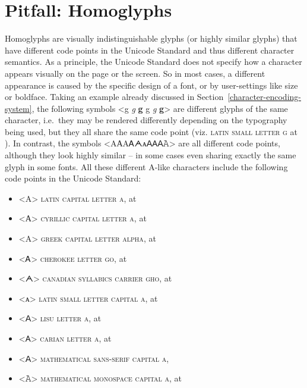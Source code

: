 \section{Pitfall: Homoglyphs}
\label{pitfall-homoglyphs}

Homoglyphs are visually indistinguishable glyphs (or highly similar glyphs) that
have different code points in the Unicode Standard and thus different character
semantics. As a principle, the Unicode Standard does not specify how a character
appears visually on the page or the screen. So in most cases, a different
appearance is caused by the specific design of a font, or by user-settings like
size or boldface. Taking an example already discussed in
Section~\ref{character-encoding-system}, the following symbols <g {\large \textit{g}}
\textbf{g} { {\small g} \textit{g} \textbf{g}}> are different
glyphs of the same character, i.e.~they may be rendered differently depending on
the typography being used, but they all share the same code point (viz.
\textsc{latin small letter g} at ). In contrast, the symbols
<{AАΑᎪᗅᴀꓮ𐊠𝖠𝙰}> are all different code points,
although they look highly similar -- in some cases even sharing exactly the same
glyph in some fonts. All these different A-like characters include the following
code points in the Unicode Standard:

\begin{itemize}
	\item[] <{A}> \textsc{latin capital letter a}, at  
	\item[] <{А}> \textsc{cyrillic capital letter a}, at  
	\item[] <{Α}> \textsc{greek capital letter alpha}, at  
	\item[] <{Ꭺ}> \textsc{cherokee letter go}, at  
	\item[] <{ᗅ}> \textsc{canadian syllabics carrier gho}, at  
	\item[] <{ᴀ}> \textsc{latin small letter capital a}, at  
	\item[] <{ꓮ}> \textsc{lisu letter a}, at  
	\item[] <{𐊠}> \textsc{carian letter a}, at  
	\item[] <{𝖠}> \textsc{mathematical sans-serif capital a},  
	\item[] <{𝙰}> \textsc{mathematical monospace capital a}, at  
\end{itemize}


